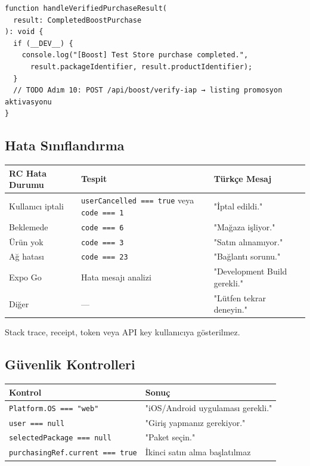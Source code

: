 \documentclass[12pt,a4paper]{article}
\begin{document}
\begin{lstlisting}[language={}]
function handleVerifiedPurchaseResult(
  result: CompletedBoostPurchase
): void {
  if (__DEV__) {
    console.log("[Boost] Test Store purchase completed.",
      result.packageIdentifier, result.productIdentifier);
  }
  // TODO Adım 10: POST /api/boost/verify-iap → listing promosyon aktivasyonu
}
\end{lstlisting}

\subsection{Hata Sınıflandırma}

\begin{center}
\begin{tabular}{lll}
  \toprule
  \textbf{RC Hata Durumu} & \textbf{Tespit} & \textbf{Türkçe Mesaj}\\
  \midrule
  Kullanıcı iptali & \texttt{userCancelled === true} veya \texttt{code === 1} & "İptal edildi."\\
  Beklemede & \texttt{code === 6} & "Mağaza işliyor."\\
  Ürün yok & \texttt{code === 3} & "Satın alınamıyor."\\
  Ağ hatası & \texttt{code === 23} & "Bağlantı sorunu."\\
  Expo Go & Hata mesajı analizi & "Development Build gerekli."\\
  Diğer & — & "Lütfen tekrar deneyin."\\
  \bottomrule
\end{tabular}
\end{center}

Stack trace, receipt, token veya API key kullanıcıya gösterilmez.

\subsection{Güvenlik Kontrolleri}

\begin{center}
\begin{tabular}{ll}
  \toprule
  \textbf{Kontrol} & \textbf{Sonuç}\\
  \midrule
  \texttt{Platform.OS === "web"} & "iOS/Android uygulaması gerekli."\\
  \texttt{user === null} & "Giriş yapmanız gerekiyor."\\
  \texttt{selectedPackage === null} & "Paket seçin."\\
  \texttt{purchasingRef.current === true} & İkinci satın alma başlatılmaz\\
  \bottomrule
\end{tabular}
\end{center}
\end{document}
